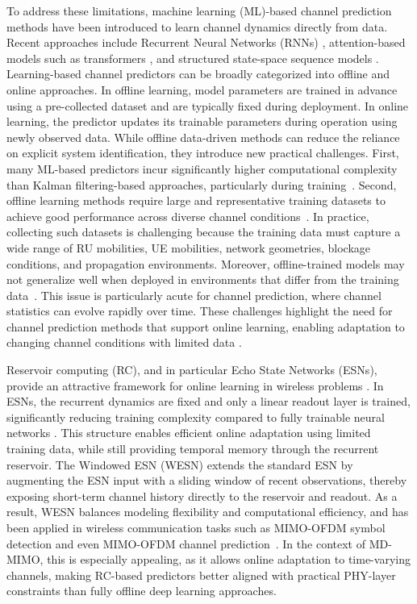 \documentclass[lettersize,journal]{IEEEtran}
\begin{document}
To address these limitations, machine learning (ML)-based channel prediction methods have been introduced to learn channel dynamics directly from data. 
Recent approaches include Recurrent Neural Networks (RNNs) \cite{lstm_vs_kf}, attention-based models such as transformers \cite{channelformer, linformer}, and structured state-space sequence models \cite{channelmamba}.
Learning-based channel predictors can be broadly categorized into offline and online approaches.
In offline learning, model parameters are trained in advance using a pre-collected dataset and are typically fixed during deployment.
In online learning, the predictor updates its trainable parameters during operation using newly observed data.
While offline data-driven methods can reduce the reliance on explicit system identification, they introduce new practical challenges.
First, many ML-based predictors incur significantly higher computational complexity than Kalman filtering-based approaches, particularly during training~\cite{kim_kalman_ml}.
Second, offline learning methods require large and representative training datasets to achieve good performance across diverse channel conditions~\cite{chan_pred_meta_learning}.
In practice, collecting such datasets is challenging because the training data must capture a wide range of RU mobilities, UE mobilities, network geometries, blockage conditions, and propagation environments.
Moreover, offline-trained models may not generalize well when deployed in environments that differ from the training data~\cite{chan_pred_meta_learning}.
This issue is particularly acute for channel prediction, where channel statistics can evolve rapidly over time.
These challenges highlight the need for channel prediction methods that support online learning, enabling adaptation to changing channel conditions with limited data \cite{small_dataset}.

Reservoir computing (RC), and in particular Echo State Networks (ESNs), provide an attractive framework for online learning in wireless problems \cite{universal_receiver, jiarui_real_time}. 
In ESNs, the recurrent dynamics are fixed and only a linear readout layer is trained, significantly reducing training complexity compared to fully trainable neural networks \cite{jaeger2007echo}. 
This structure enables efficient online adaptation using limited training data, while still providing temporal memory through the recurrent reservoir. 
The Windowed ESN (WESN) \cite{wesn} extends the standard ESN by augmenting the ESN input with a sliding window of recent observations, thereby exposing short-term channel history directly to the reservoir and readout.
As a result, WESN balances modeling flexibility and computational efficiency, and has been applied in wireless communication tasks such as MIMO-OFDM symbol detection \cite{universal_receiver, shashank_xai, wesn, tensor_RC} and even MIMO-OFDM channel prediction~\cite{wiopt, icnc_dmimo}. 
In the context of MD-MIMO, this is especially appealing, as it allows online adaptation to time-varying channels, making RC-based predictors better aligned with practical PHY-layer constraints than fully offline deep learning approaches.
\end{document}
